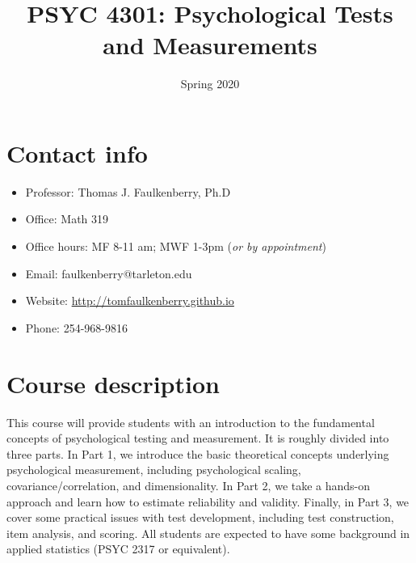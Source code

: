 \documentclass[10pt]{article}
\date{Spring 2020}
\title{PSYC 4301: Psychological Tests and Measurements}
\begin{document}
\maketitle

\section*{Contact info}
\label{sec:orgad6b6b3}
\begin{itemize}
\item Professor: Thomas J. Faulkenberry, Ph.D
\item Office: Math 319
\item Office hours: MF 8-11 am; MWF 1-3pm (\emph{or by appointment})
\item Email: faulkenberry@tarleton.edu
\item Website: \url{http://tomfaulkenberry.github.io}
\item Phone: 254-968-9816
\end{itemize}

\section*{Course description}
\label{sec:org02268bf}

This course will provide students with an introduction to the fundamental concepts of psychological testing and measurement. It is roughly divided into three parts. In Part 1, we introduce the basic theoretical concepts underlying psychological measurement, including psychological scaling, covariance/correlation, and dimensionality. In Part 2, we take a hands-on approach and learn how to estimate reliability and validity. Finally, in Part 3, we cover some practical issues with test development, including test construction, item analysis, and scoring. All students are expected to have some background in applied statistics (PSYC 2317 or equivalent). 
\end{document}
